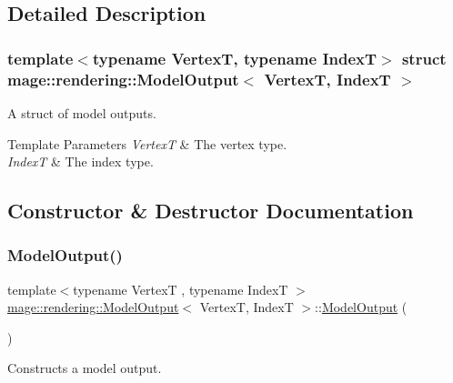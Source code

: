 \subsection{Detailed Description}
\subsubsection*{template$<$typename VertexT, typename IndexT$>$\newline
struct mage\+::rendering\+::\+Model\+Output$<$ Vertex\+T, Index\+T $>$}

A struct of model outputs.


\begin{DoxyTemplParams}{Template Parameters}
{\em VertexT} & The vertex type. \\
\hline
{\em IndexT} & The index type. \\
\hline
\end{DoxyTemplParams}


\subsection{Constructor \& Destructor Documentation}
\mbox{\label{structmage_1_1rendering_1_1_model_output_a0aaa7f6abf4c5df03fe02b49ef189e3b}} 
\subsubsection{\texorpdfstring{Model\+Output()}{ModelOutput()}\hspace{0.1cm}{\footnotesize\ttfamily [1/3]}}
{\footnotesize\ttfamily template$<$typename VertexT , typename IndexT $>$ \\
\mbox{\hyperlink{structmage_1_1rendering_1_1_model_output}{mage\+::rendering\+::\+Model\+Output}}$<$ VertexT, IndexT $>$\+::\mbox{\hyperlink{structmage_1_1rendering_1_1_model_output}{Model\+Output}} (\begin{DoxyParamCaption}{ }\end{DoxyParamCaption})\hspace{0.3cm}{\ttfamily [default]}}

Constructs a model output. \mbox{\label{structmage_1_1rendering_1_1_model_output_a52280b5fe47b266e44bf65ea5dcd6752}} 

